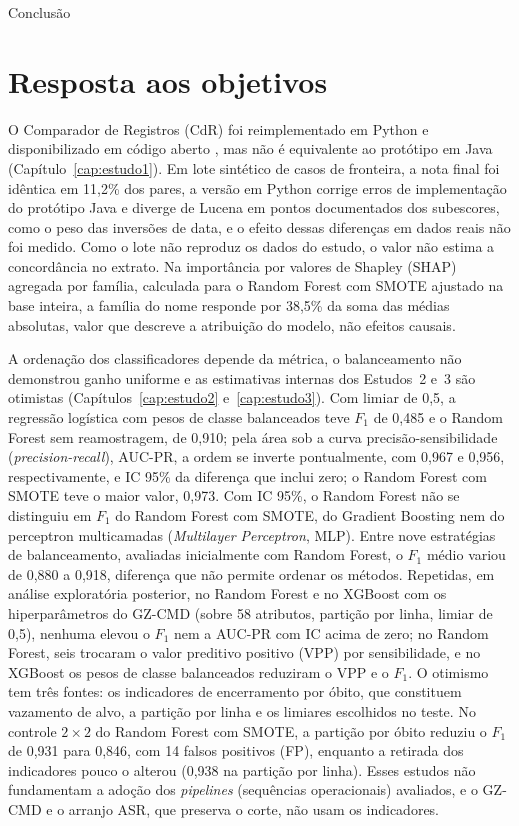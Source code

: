 \begin{chapter}{Conclusão}
\section{Resposta aos objetivos}\label{sec:concl-sintese}

O Comparador de Registros (CdR) foi reimplementado em Python e disponibilizado em código aberto \cite{Jardim2025comparador}, mas não é equivalente ao protótipo em Java (Capítulo~\ref{cap:estudo1}). Em lote sintético de casos de fronteira, a nota final foi idêntica em 11,2\% dos pares, a versão em Python corrige erros de implementação do protótipo Java e diverge de Lucena em pontos documentados dos subescores, como o peso das inversões de data, e o efeito dessas diferenças em dados reais não foi medido. Como o lote não reproduz os dados do estudo, o valor não estima a concordância no extrato. Na importância por valores de Shapley (SHAP) agregada por família, calculada para o Random Forest com SMOTE ajustado na base inteira, a família do nome responde por 38,5\% da soma das médias absolutas, valor que descreve a atribuição do modelo, não efeitos causais.

A ordenação dos classificadores depende da métrica, o balanceamento não demonstrou ganho uniforme e as estimativas internas dos Estudos~2 e~3 são otimistas (Capítulos~\ref{cap:estudo2} e~\ref{cap:estudo3}). Com limiar de 0,5, a regressão logística com pesos de classe balanceados teve $F_1$ de 0,485 e o Random Forest sem reamostragem, de 0,910; pela área sob a curva precisão-sensibilidade (\textit{precision-recall}), AUC-PR, a ordem se inverte pontualmente, com 0,967 e 0,956, respectivamente, e IC 95\% da diferença que inclui zero; o Random Forest com SMOTE teve o maior valor, 0,973. Com IC 95\%, o Random Forest não se distinguiu em $F_1$ do Random Forest com SMOTE, do Gradient Boosting nem do perceptron multicamadas (\textit{Multilayer Perceptron}, MLP). Entre nove estratégias de balanceamento, avaliadas inicialmente com Random Forest, o $F_1$ médio variou de 0,880 a 0,918, diferença que não permite ordenar os métodos. Repetidas, em análise exploratória posterior, no Random Forest e no XGBoost com os hiperparâmetros do GZ-CMD (sobre 58 atributos, partição por linha, limiar de 0,5), nenhuma elevou o $F_1$ nem a AUC-PR com IC acima de zero; no Random Forest, seis trocaram o valor preditivo positivo (VPP) por sensibilidade, e no XGBoost os pesos de classe balanceados reduziram o VPP e o $F_1$. O otimismo tem três fontes: os indicadores de encerramento por óbito, que constituem vazamento de alvo, a partição por linha e os limiares escolhidos no teste. No controle $2\times2$ do Random Forest com SMOTE, a partição por óbito reduziu o $F_1$ de 0,931 para 0,846, com 14 falsos positivos (FP), enquanto a retirada dos indicadores pouco o alterou (0,938 na partição por linha). Esses estudos não fundamentam a adoção dos \textit{pipelines} (sequências operacionais) avaliados, e o GZ-CMD e o arranjo ASR, que preserva o corte, não usam os indicadores.


\end{chapter}
